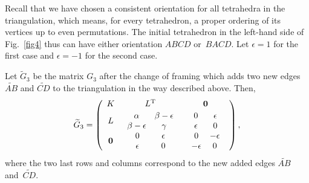 \documentclass[pdftex]{sigma}
\begin{document}
Recall that we have chosen a consistent orientation for all tetrahedra in the triangulation, which means, for every tetrahedron, a proper ordering of its vertices up to even permutations. The initial tetrahedron in the left-hand side of Fig.~\ref{fig4} thus can have either orientation $ABCD$ or~$BACD$. Let $\epsilon=1$ for the f\/irst case and $\epsilon=-1$ for the second case.

\begin{theorem}
\label{th_sec4}
Let $\widetilde G_3$ be the matrix $G_3$ after the change of framing which adds two new edges $\widetilde{AB}$ and $\widetilde{CD}$ to the triangulation in the way described above. Then,
\begin{equation}
\widetilde G_3 = \left( \begin{array}{ccc} K & L^{\rm T} & {\bf 0} \\[.5ex]
L & \begin{array}{cc} \alpha & \beta-\epsilon \\ \beta-\epsilon & \gamma \end{array} & \begin{array}{cc} 0 & \;\,\epsilon\;\, \\
\;\,\epsilon\;\, & 0 \end{array} \\ {\bf 0} & \begin{array}{cc} 0 & \;\;\;\epsilon\;\;\; \\ \;\;\;\epsilon\;\;\; & 0
\end{array} & \begin{array}{cc} 0 & -\epsilon \\ -\epsilon & 0 \end{array}\end{array} \right),
\label{eq_***}
\end{equation}
where the two last rows and columns correspond to the new added edges $\widetilde{AB}$ and~$\widetilde{CD}$.
\end{theorem}
\end{document}
